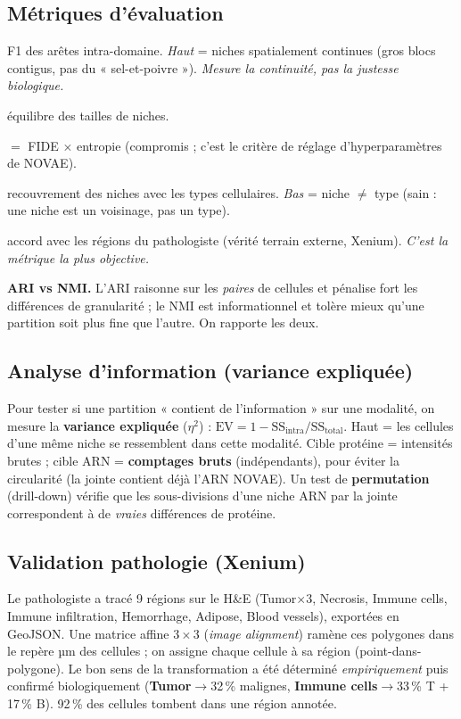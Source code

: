 \documentclass[11pt,a4paper]{article}
\begin{document}
\subsection{Métriques d'évaluation}
\begin{description}[noitemsep,leftmargin=1.4em]
  \item[\textbf{FIDE}] F1 des arêtes intra-domaine. \emph{Haut} = niches spatialement
        continues (gros blocs contigus, pas du « sel-et-poivre »). \emph{Mesure la
        continuité, pas la justesse biologique.}
  \item[\textbf{Entropie normalisée}] équilibre des tailles de niches.
  \item[\textbf{Heuristique}] $=$ FIDE $\times$ entropie (compromis ; c'est le critère de
        réglage d'hyperparamètres de NOVAE).
  \item[\textbf{ARI / NMI vs types}] recouvrement des niches avec les types cellulaires.
        \emph{Bas} = niche $\neq$ type (sain : une niche est un voisinage, pas un type).
  \item[\textbf{ARI / NMI / homogénéité vs pathologie}] accord avec les régions du
        pathologiste (vérité terrain externe, Xenium). \emph{C'est la métrique la plus
        objective.}
\end{description}
\textbf{ARI vs NMI.} L'ARI raisonne sur les \emph{paires} de cellules et pénalise fort les
différences de granularité ; le NMI est informationnel et tolère mieux qu'une partition
soit plus fine que l'autre. On rapporte les deux.

\subsection{Analyse d'information (variance expliquée)}
Pour tester si une partition « contient de l'information » sur une modalité, on mesure la
\textbf{variance expliquée} ($\eta^2$) : $\mathrm{EV} = 1 - \mathrm{SS}_{\text{intra}}/
\mathrm{SS}_{\text{total}}$. Haut = les cellules d'une même niche se ressemblent dans cette
modalité. Cible protéine = intensités brutes ; cible ARN = \textbf{comptages bruts}
(indépendants), pour éviter la circularité (la jointe contient déjà l'ARN NOVAE). Un test
de \textbf{permutation} (drill-down) vérifie que les sous-divisions d'une niche ARN par la
jointe correspondent à de \emph{vraies} différences de protéine.

\subsection{Validation pathologie (Xenium)}
Le pathologiste a tracé 9 régions sur le H\&E (Tumor$\times$3, Necrosis, Immune cells,
Immune infiltration, Hemorrhage, Adipose, Blood vessels), exportées en GeoJSON. Une matrice
affine $3\times3$ (\emph{image alignment}) ramène ces polygones dans le repère µm des
cellules ; on assigne chaque cellule à sa région (point-dans-polygone). Le bon sens de la
transformation a été déterminé \emph{empiriquement} puis confirmé biologiquement
(\textbf{Tumor}$\rightarrow$32\,\% malignes, \textbf{Immune cells}$\rightarrow$33\,\% T +
17\,\% B). 92\,\% des cellules tombent dans une région annotée.
\end{document}
